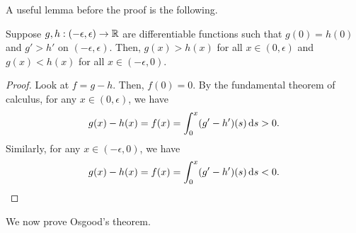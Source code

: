 A useful lemma before the proof is the following.
\begin{lemma}
    Suppose $g,h:(-\epsilon,\epsilon) \to \mathbb{R}$ are differentiable functions such that $g(0) = h(0)$ and $g' > h'$ on $(-\epsilon,\epsilon)$. Then, $g(x) > h(x)$ for all $x \in (0,\epsilon)$ and $g(x) < h(x)$ for all $x \in (-\epsilon,0)$.
\end{lemma}
\begin{proof}
    Look at $f = g-h$. Then, $f(0) = 0$. By the fundamental theorem of calculus, for any $x \in (0,\epsilon)$, we have
    \begin{align}
        g(x) - h(x) = f(x) = \int_{0}^{x} (g'-h')(s) \, \mathrm{d}s > 0.
    \end{align}
    Similarly, for any $x \in (-\epsilon,0)$, we have
    \begin{align}
        g(x) - h(x) = f(x) = \int_{0}^{x} (g'-h')(s) \, \mathrm{d}s < 0.
    \end{align}
\end{proof}


We now prove Osgood's theorem.

